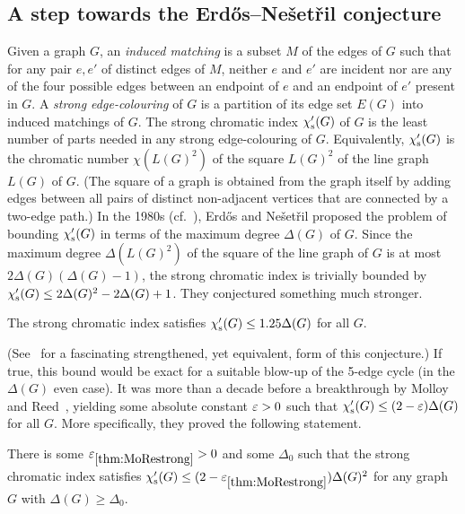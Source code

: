 \subsection{A step towards the Erd\H{o}s--Ne\v{s}et\v{r}il conjecture}\label{sub:ErdosNesetril}


Given a graph $G$, an {\em induced matching} is a subset $M$ of the edges of $G$ such that for any pair $e,e'$ of distinct edges of $M$, neither $e$ and $e'$ are incident nor are any of the four possible edges between an endpoint of $e$ and an endpoint of $e'$ present in $G$.
A {\em strong edge-colouring} of $G$ is a partition of its edge set $E(G)$ into induced matchings of $G$.
The strong chromatic index $\chi'_{\operatorname{s}}(G)$ of $G$ is the least number of parts needed in any strong edge-colouring of $G$. Equivalently, $\chi'_{\operatorname{s}}(G)$ is the chromatic number $\chi(L(G)^2)$ of the square $L(G)^2$ of the line graph $L(G)$ of $G$. (The square of a graph is obtained from the graph itself by adding edges between all pairs of distinct non-adjacent vertices that are connected by a two-edge path.)
In the 1980s (cf.~\cite{Erd88}), Erd\H{o}s and Ne\v{s}et\v{r}il proposed the problem of bounding $\chi'_{\operatorname{s}}(G)$ in terms of the maximum degree $\Delta(G)$ of $G$. Since the maximum degree $\Delta(L(G)^2)$ of the square of the line graph of $G$ is at most $2\Delta(G)(\Delta(G)-1)$, the strong chromatic index is trivially bounded by $\chi'_{\operatorname{s}}(G)\le 2\Delta(G)^2-2\Delta(G)+1$. They conjectured something much stronger.

\begin{conj}\label{conj:ErNe}
The strong chromatic index satisfies $\chi'_{\operatorname{s}}(G)\le 1.25\Delta(G)$ for all $G$.
\end{conj}

\noindent
(See~\cite{JKP19} for a fascinating strengthened, yet equivalent, form of this conjecture.)
If true, this bound would be exact for a suitable blow-up of the 5-edge cycle (in the $\Delta(G)$ even case).
It was more than a decade before a breakthrough by Molloy and Reed~\cite{MoRe97}, yielding some absolute constant $\varepsilon>0$ such that $\chi'_{\operatorname{s}}(G)\le (2-\varepsilon)\Delta(G)$ for all $G$.
More specifically, they proved the following statement.

\begin{theorem}\label{thm:MoRestrong}
There is some $\varepsilon_{\ref{thm:MoRestrong}}>0$ and some $\Delta_0$ such that the strong chromatic index satisfies $\chi'_{\operatorname{s}}(G)\leq (2-\varepsilon_{\ref{thm:MoRestrong}})\Delta(G)^2$ for any graph $G$ with $\Delta(G)\ge \Delta_0$.
\end{theorem}

